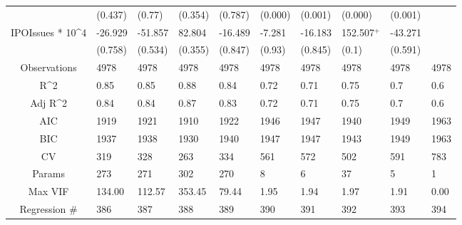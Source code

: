 \documentclass{article}
\begin{document}
\begin{table}[H]
\begin{tabular}{|clllllllll|}
   & (0.437) & (0.77) & (0.354) & (0.787) & (0.000) & (0.001) & (0.000) & (0.001) &  \\ 
  IPOIssues * 10^4 & -26.929 & -51.857 & 82.804 & -16.489 & -7.281 & -16.183 & 152.507$^{+}$ & -43.271 &  \\ 
   & (0.758) & (0.534) & (0.355) & (0.847) & (0.93) & (0.845) & (0.1) & (0.591) &  \\ 
  \hline 
 Observations & 4978 & 4978 & 4978 & 4978 & 4978 & 4978 & 4978 & 4978 & 4978 \\ 
  R^2 & 0.85 & 0.85 & 0.88 & 0.84 & 0.72 & 0.71 & 0.75 & 0.7 & 0.6 \\ 
  Adj R^2 & 0.84 & 0.84 & 0.87 & 0.83 & 0.72 & 0.71 & 0.75 & 0.7 & 0.6 \\ 
  AIC & 1919 & 1921 & 1910 & 1922 & 1946 & 1947 & 1940 & 1949 & 1963 \\ 
  BIC & 1937 & 1938 & 1930 & 1940 & 1947 & 1947 & 1943 & 1949 & 1963 \\ 
  CV & 319 & 328 & 263 & 334 & 561 & 572 & 502 & 591 & 783 \\ 
  Params & 273 & 271 & 302 & 270 & 8 & 6 & 37 & 5 & 1 \\ 
  Max VIF & 134.00 & 112.57 & 353.45 & 79.44 & 1.95 & 1.94 & 1.97 & 1.91 & 0.00 \\ 
  Regression \# & 386 & 387 & 388 & 389 & 390 & 391 & 392 & 393 & 394 \\ 
   \hline
\end{tabular}
 
\end{table}
\end{document}
